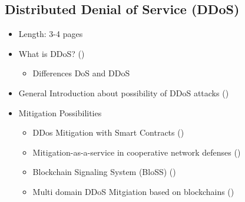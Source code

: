 \subsection{Distributed Denial of Service (DDoS)}

\begin{itemize}
  \item Length: 3-4 pages
  \item What is DDoS? (\cite{Bishop2004})
  \begin{itemize}
    \item Differences DoS and DDoS
  \end{itemize}
  \item General Introduction about possibility of DDoS attacks (\cite{Bishop2004})
  \item Mitigation Possibilities
  \begin{itemize}
    \item DDos Mitigation with Smart Contracts (\cite{Rodrigues2017})
    \item Mitigation-as-a-service in cooperative network defenses (\cite{Mannhart2018})
    \item Blockchain Signaling System (BloSS) (\cite{Rodrigues})
    \item Multi domain DDoS Mitgiation based on blockchains (\cite{Rodrigues2017a})
  \end{itemize}
\end{itemize}
